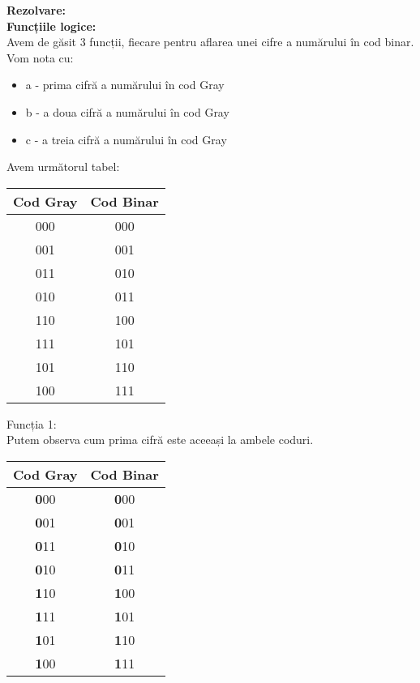 \documentclass{article}
\begin{document}
\large\textbf{Rezolvare:}\normalsize\\
\textbf{Funcțiile logice:}\\
\text Avem de găsit 3 funcții, fiecare pentru aflarea unei cifre a numărului în cod binar.\\ Vom nota cu:
\begin{itemize}
  \item a - prima cifră a numărului în cod Gray
  \item b - a doua cifră a numărului în cod Gray
  \item c - a treia cifră a numărului în cod Gray
\end{itemize}
Avem următorul tabel:
\begin{center}
\begin{tabular}{||c c||} 
 \hline
 Cod Gray & Cod Binar \\ [0.5ex] 
 \hline\hline
 000 & 000 \\ 
 \hline
 001 & 001 \\
 \hline
 011 & 010 \\
 \hline
 010 & 011 \\
 \hline
 110 & 100 \\ 
 \hline
 111 & 101 \\
 \hline
 101 & 110 \\
 \hline
 100 & 111 \\ 
 \hline 
\end{tabular}
\end{center}
\text Funcția 1:\\
\text Putem observa cum prima cifră este aceeași la ambele coduri.
\begin{center}
\begin{tabular}{||c c||} 
 \hline
 Cod Gray & Cod Binar \\ [0.5ex] 
 \hline\hline
 \textbf{0}00 & \textbf{0}00 \\ 
 \hline
 \textbf{0}01 & \textbf{0}01 \\
 \hline
 \textbf{0}11 & \textbf{0}10 \\
 \hline
 \textbf{0}10 & \textbf{0}11 \\
 \hline
 \textbf{1}10 & \textbf{1}00 \\ 
 \hline
 \textbf{1}11 & \textbf{1}01 \\
 \hline
 \textbf{1}01 & \textbf{1}10 \\
 \hline
 \textbf{1}00 & \textbf{1}11 \\ 
 \hline 
\end{tabular}
\end{center}
\end{document}

